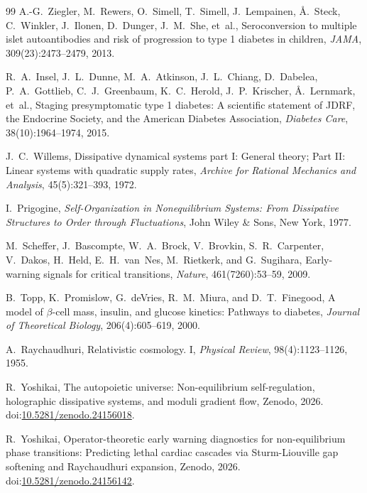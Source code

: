 \documentclass[11pt,a4paper]{article}
\begin{document}
\begin{thebibliography}{99}
A.-G.~Ziegler, M.~Rewers, O.~Simell, T.~Simell, J.~Lempainen, {\AA}.~Steck, C.~Winkler, J.~Ilonen, D.~Dunger, J.~M.~She, et~al.,
\newblock Seroconversion to multiple islet autoantibodies and risk of progression to type 1 diabetes in children,
\newblock \emph{JAMA}, 309(23):2473--2479, 2013.

R.~A.~Insel, J.~L.~Dunne, M.~A.~Atkinson, J.~L.~Chiang, D.~Dabelea, P.~A.~Gottlieb, C.~J.~Greenbaum, K.~C.~Herold, J.~P.~Krischer, {\AA}.~Lernmark, et~al.,
\newblock Staging presymptomatic type 1 diabetes: A scientific statement of JDRF, the Endocrine Society, and the American Diabetes Association,
\newblock \emph{Diabetes Care}, 38(10):1964--1974, 2015.

J.~C.~Willems,
\newblock Dissipative dynamical systems part I: General theory; Part II: Linear systems with quadratic supply rates,
\newblock \emph{Archive for Rational Mechanics and Analysis}, 45(5):321--393, 1972.

I.~Prigogine,
\newblock \emph{Self-Organization in Nonequilibrium Systems: From Dissipative Structures to Order through Fluctuations},
\newblock John Wiley \& Sons, New York, 1977.

M.~Scheffer, J.~Bascompte, W.~A.~Brock, V.~Brovkin, S.~R.~Carpenter, V.~Dakos, H.~Held, E.~H.~van~Nes, M.~Rietkerk, and G.~Sugihara,
\newblock Early-warning signals for critical transitions,
\newblock \emph{Nature}, 461(7260):53--59, 2009.

B.~Topp, K.~Promislow, G.~deVries, R.~M.~Miura, and D.~T.~Finegood,
\newblock A model of $\beta$-cell mass, insulin, and glucose kinetics: Pathways to diabetes,
\newblock \emph{Journal of Theoretical Biology}, 206(4):605--619, 2000.

A.~Raychaudhuri,
\newblock Relativistic cosmology. I,
\newblock \emph{Physical Review}, 98(4):1123--1126, 1955.

R.~Yoshikai,
\newblock The autopoietic universe: Non-equilibrium self-regulation, holographic dissipative systems, and moduli gradient flow,
\newblock Zenodo, 2026. doi:\href{https://doi.org/10.5281/zenodo.24156018}{10.5281/zenodo.24156018}.

R.~Yoshikai,
\newblock Operator-theoretic early warning diagnostics for non-equilibrium phase transitions: Predicting lethal cardiac cascades via Sturm-Liouville gap softening and Raychaudhuri expansion,
\newblock Zenodo, 2026. doi:\href{https://doi.org/10.5281/zenodo.24156142}{10.5281/zenodo.24156142}.

\end{thebibliography}
\end{document}
